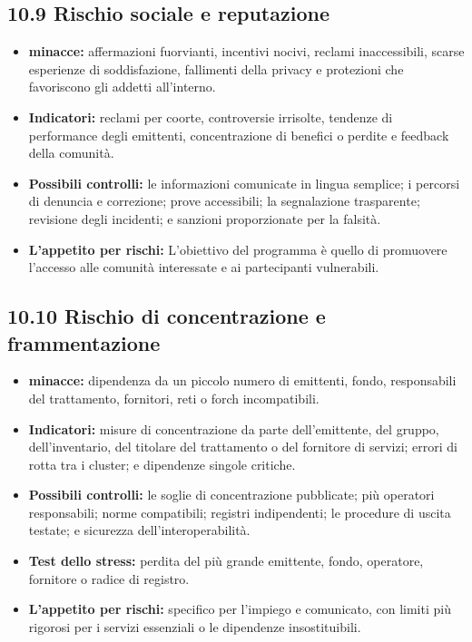 \documentclass[11pt]{article}
\begin{document}
\subsection*{10.9 Rischio sociale e reputazione}

\begin{itemize}[leftmargin=*]
\item \textbf{minacce:} affermazioni fuorvianti, incentivi nocivi, reclami inaccessibili, scarse esperienze di soddisfazione, fallimenti della privacy e protezioni che favoriscono gli addetti all'interno.
\item \textbf{Indicatori:} reclami per coorte, controversie irrisolte, tendenze di performance degli emittenti, concentrazione di benefici o perdite e feedback della comunità.
\item \textbf{Possibili controlli:} le informazioni comunicate in lingua semplice; i percorsi di denuncia e correzione; prove accessibili; la segnalazione trasparente; revisione degli incidenti; e sanzioni proporzionate per la falsità.
\item \textbf{L'appetito per rischi:} L'obiettivo del programma è quello di promuovere l'accesso alle comunità interessate e ai partecipanti vulnerabili.
\end{itemize}
\subsection*{10.10 Rischio di concentrazione e frammentazione}

\begin{itemize}[leftmargin=*]
\item \textbf{minacce:} dipendenza da un piccolo numero di emittenti, fondo, responsabili del trattamento, fornitori, reti o forch incompatibili.
\item \textbf{Indicatori:} misure di concentrazione da parte dell'emittente, del gruppo, dell'inventario, del titolare del trattamento o del fornitore di servizi; errori di rotta tra i cluster; e dipendenze singole critiche.
\item \textbf{Possibili controlli:} le soglie di concentrazione pubblicate; più operatori responsabili; norme compatibili; registri indipendenti; le procedure di uscita testate; e sicurezza dell'interoperabilità.
\item \textbf{Test dello stress:} perdita del più grande emittente, fondo, operatore, fornitore o radice di registro.
\item \textbf{L'appetito per rischi:} specifico per l'impiego e comunicato, con limiti più rigorosi per i servizi essenziali o le dipendenze insostituibili.
\end{itemize}
\end{document}
